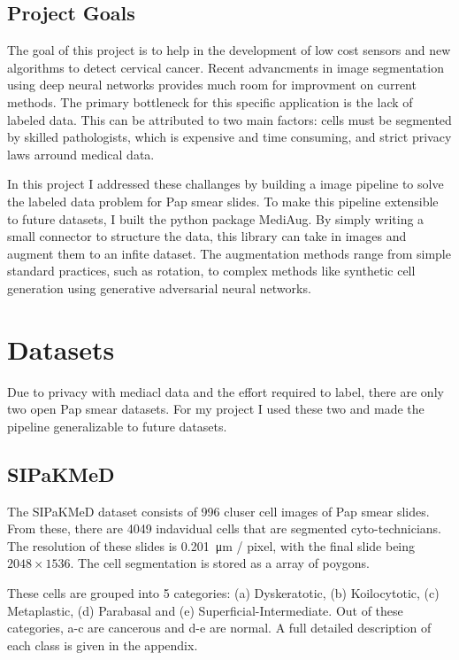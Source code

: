 \documentclass[ms,electronic,oneside,twosidetoc,letterpaper,chaptercenter,parttop]{byumsphd}
\begin{document}
\section{Project Goals}

The goal of this project is to help in the development of low cost sensors and new algorithms to detect cervical cancer.
Recent advancments in image segmentation using deep neural networks provides much room for improvment on current methods.
The primary bottleneck for this specific application is the lack of labeled data. This can be attributed to two main factors:
cells must be segmented by skilled pathologists, which is expensive and time consuming, and strict privacy laws arround medical data.

In this project I addressed these challanges by building a image pipeline to solve the labeled data problem for Pap smear slides. To make this 
pipeline extensible to future datasets, I built the python package MediAug. By simply writing a small connector to structure the data, this library
can take in images and augment them to an infite dataset. The augmentation methods range from simple standard practices, such as rotation, to complex methods
like synthetic cell generation using generative adversarial neural networks.

\chapter{Datasets}

Due to privacy with mediacl data and the effort required to label, there are only two open Pap smear datasets. For my project I used these two and made the pipeline generalizable
to future datasets.

\section{SIPaKMeD}

The SIPaKMeD dataset consists of 996 cluser cell images of Pap smear slides. From these, there are
4049 indavidual cells that are segmented cyto-technicians. The resolution of these slides is \SI{0.201}{\micro\metre} / pixel,
with the final slide being $2048\times 1536$. The cell segmentation is stored as a array of poygons.

These cells are grouped into 5 categories: 
(a) Dyskeratotic, (b) Koilocytotic, (c) Metaplastic, (d) Parabasal and (e) Superficial-Intermediate. Out of these categories, a-c are
cancerous and d-e are normal. A full detailed description of each class is given in the appendix.
\end{document}

